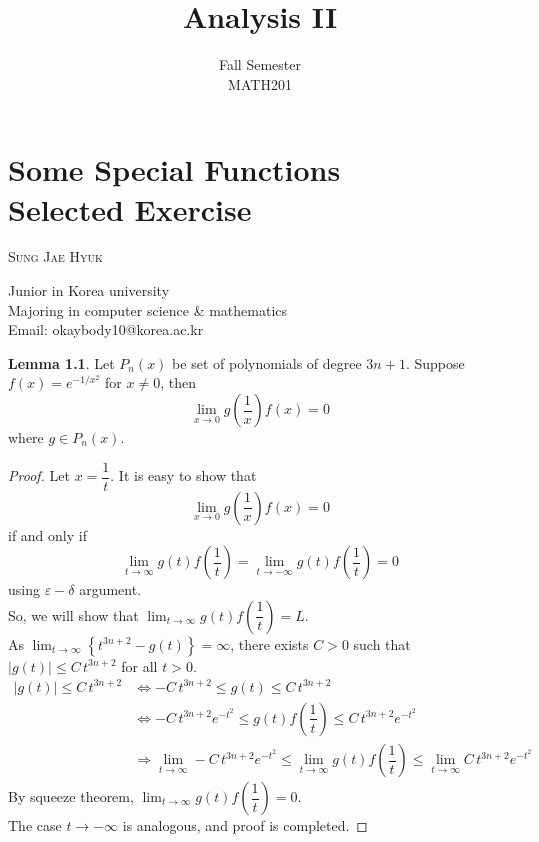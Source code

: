 \documentclass[12pt]{book}
\title{Analysis II}
\author{Fall Semester\\MATH201}
\date{}
\makeatletter
\theoremstyle{definition}
\newtheorem{lemma}[theorem]{Lemma}
\newcommand{\chapterauthor}[1]{%
	{\parindent0pt\vspace*{-25pt}%
	\linespread{1.1}\large\scshape#1%
	\par\nobreak\vspace*{35pt}}
	\@afterheading%
}
\newcommand{\chapterother}[1]{%
	{\parindent0pt\vspace*{-25pt}%
	\linespread{1.1}#1%
	\par\nobreak\vspace*{35pt}}
	\@afterheading%
}
\makeatother
\begin{document}
	\chapter{Some Special Functions\\Selected Exercise}
	\chapterauthor{Sung Jae Hyuk}
	\chapterother{Junior in Korea university\\ Majoring in computer science \& mathematics\\Email: okaybody10@korea.ac.kr}
	\listoftheorems[title = List of Exercise]
	\newpage
	\begin{lemma}
		Let $P_n(x)$ be set of polynomials of degree $3n+1$. Suppose $f(x)=e^{-1/x^2}$ for $x\neq 0$, then
		\begin{equation*}
			\displaystyle\lim_{x\rightarrow 0} g\left(\dfrac{1}{x}\right)f(x)=0
		\end{equation*} where $g \in P_n(x)$.
	\end{lemma}
	\begin{proof}
		Let $x=\dfrac{1}{t}$. It is easy to show that \begin{equation*}
			\displaystyle\lim_{x\rightarrow 0}g\left(\dfrac{1}{x}\right)f(x)=0
		\end{equation*} if and only if
		\begin{equation*}
			\displaystyle\lim_{t\rightarrow\infty}g(t)f\left(\dfrac{1}{t}\right)=\lim_{t\rightarrow-\infty}g(t)f\left(\dfrac{1}{t}\right)=0
		\end{equation*} using $\varepsilon-\delta$ argument.\\
		So, we will show that $\displaystyle\lim_{t\rightarrow \infty}g(t)f\left(\dfrac{1}{t}\right)=L.$\\
		As $\displaystyle\lim_{t\rightarrow \infty}\left\{t^{3n+2}-g(t)\right\}=\infty$, there exists $C>0$ such that $\left\vert g(t)\right\rvert \leq C\,t^{3n+2}$ for all $t> 0$.
		\begin{align*}
			|g(t)|\leq C\,t^{3n+2} &\Leftrightarrow -C\,t^{3n+2}\leq g(t) \leq C\,t^{3n+2}\\
			&\Leftrightarrow -C\,t^{3n+2}e^{-t^2}\leq g(t)f\left(\dfrac{1}{t}\right) \leq C\,t^{3n+2}e^{-t^2}\\
			&\Rightarrow \displaystyle\lim_{t\rightarrow \infty}-C\,t^{3n+2}e^{-t^2}\leq \lim_{t\rightarrow \infty}g(t)f\left(\dfrac{1}{t}\right) \leq \lim_{t\rightarrow\infty}C\,t^{3n+2}e^{-t^2}
		\end{align*}
		By squeeze theorem, $\displaystyle\lim_{ t\rightarrow \infty} g(t)f\left(\dfrac{1}{t}\right)=0$.\\
		The case $t\rightarrow-\infty$ is analogous, and proof is completed.
	\end{proof}
\end{document}
